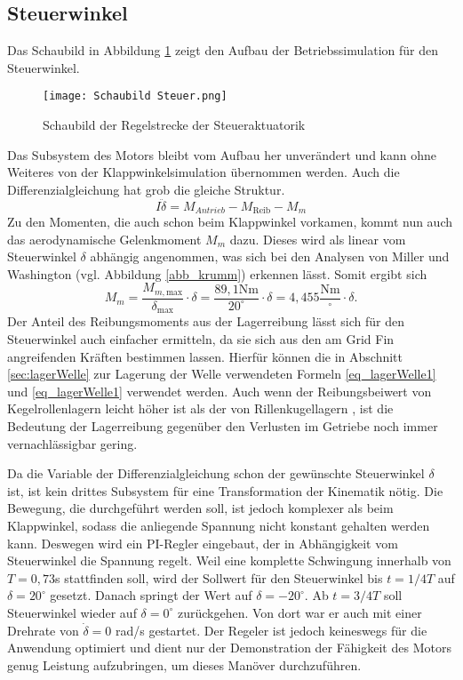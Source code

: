\subsection{Steuerwinkel}
Das Schaubild in Abbildung \ref{abb_steuerStrecke} zeigt den Aufbau der Betriebssimulation für den Steuerwinkel.
\begin{figure}[h] 
	\centering
	\texttt{[image: Schaubild Steuer.png]}
	\caption{Schaubild der Regelstrecke der Steueraktuatorik}
	\label{abb_steuerStrecke}
\end{figure} 
Das Subsystem des Motors bleibt vom Aufbau her unverändert und kann ohne Weiteres von der Klappwinkelsimulation übernommen werden. Auch die Differenzialgleichung hat grob die gleiche Struktur.
\begin{equation}
	I\ddot{\delta} = M_{Antrieb} - M_{\mathrm{Reib}} - M_{m}
\end{equation}
Zu den Momenten, die auch schon beim Klappwinkel vorkamen, kommt nun auch das aerodynamische Gelenkmoment $M_m$ dazu. Dieses wird als linear vom Steuerwinkel $\delta$ abhängig angenommen, was sich bei den Analysen von Miller und Washington \cite{synopsis} (vgl. Abbildung \ref{abb_krumm}) erkennen lässt. Somit ergibt sich
\begin{equation}
	M_{m} = \frac{M_{m, \mathrm{max}}}{\delta_\mathrm{max}} \cdot \delta =\frac{89,1\mathrm{Nm}}{20^\circ} \cdot \delta = 4,455\frac{\mathrm{Nm}}{^\circ}\cdot \delta.
\end{equation}
Der Anteil des Reibungsmoments aus der Lagerreibung lässt sich für den Steuerwinkel auch einfacher ermitteln, da sie sich aus den am Grid Fin angreifenden Kräften bestimmen lassen. Hierfür können die in Abschnitt \ref{sec:lagerWelle} zur Lagerung der Welle verwendeten Formeln \ref{eq_lagerWelle1} und \ref{eq_lagerWelle1} verwendet werden. Auch wenn der Reibungsbeiwert von Kegelrollenlagern leicht höher ist als der von Rillenkugellagern \cite{lagerreibung}, ist die Bedeutung der Lagerreibung gegenüber den Verlusten im Getriebe noch immer vernachlässigbar gering.

Da die Variable der Differenzialgleichung schon der gewünschte Steuerwinkel $\delta$ ist, ist kein drittes Subsystem für eine Transformation der Kinematik nötig. Die Bewegung, die durchgeführt werden soll, ist jedoch komplexer als beim Klappwinkel, sodass die anliegende Spannung nicht konstant gehalten werden kann. Deswegen wird ein PI-Regler eingebaut, der in Abhängigkeit vom Steuerwinkel die Spannung regelt.
Weil eine komplette Schwingung innerhalb von $T = 0,73$s stattfinden soll, wird der Sollwert für den Steuerwinkel bis $t = 1/4T$ auf $\delta = 20^\circ$ gesetzt. Danach springt der Wert auf $\delta = -20^\circ$. Ab $t = 3/4T$ soll Steuerwinkel wieder auf $\delta = 0^\circ$ zurückgehen. Von dort war er auch mit einer Drehrate von $\dot{\delta} = 0$ rad/s gestartet.
Der Regeler ist jedoch keineswegs für die Anwendung optimiert und dient nur der Demonstration der Fähigkeit des Motors genug Leistung aufzubringen, um dieses Manöver durchzuführen.

